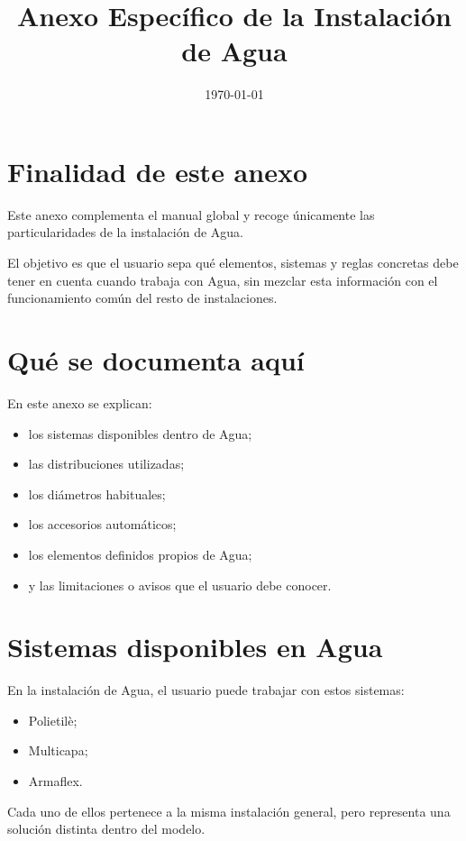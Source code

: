\documentclass[12pt,a4paper]{article}
\title{Anexo Específico de la Instalación de Agua}
\author{}
\date{\today}
\begin{document}
\maketitle
\tableofcontents
\newpage

\section{Finalidad de este anexo}

Este anexo complementa el manual global y recoge únicamente las particularidades de la instalación de Agua.

El objetivo es que el usuario sepa qué elementos, sistemas y reglas concretas debe tener en cuenta cuando trabaja con Agua, sin mezclar esta información con el funcionamiento común del resto de instalaciones.

\section{Qué se documenta aquí}

En este anexo se explican:

\begin{itemize}
\item los sistemas disponibles dentro de Agua;
\item las distribuciones utilizadas;
\item los diámetros habituales;
\item los accesorios automáticos;
\item los elementos definidos propios de Agua;
\item y las limitaciones o avisos que el usuario debe conocer.
\end{itemize}

\section{Sistemas disponibles en Agua}

En la instalación de Agua, el usuario puede trabajar con estos sistemas:

\begin{itemize}
\item Polietilè;
\item Multicapa;
\item Armaflex.
\end{itemize}

Cada uno de ellos pertenece a la misma instalación general, pero representa una solución distinta dentro del modelo.
\end{document}
